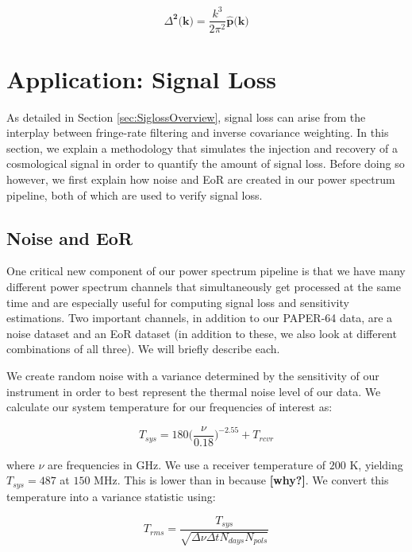 \documentclass[preprint2,numberedappendix,tighten,twocolappendix]{aastex6}  %
\newcommand{\cc}[1]{{\color{purple} \textbf{[#1]}}}
\begin{document}
\begin{equation}
\Delta^{\textbf{2}}\textbf{(k)} = \frac{k^{3}}{2\pi^{2}}\hat{\textbf{p}}\textbf{(k)}
\end{equation}

\section{Application: Signal Loss}
\label{sec:Sigloss}

As detailed in Section \ref{sec:SiglossOverview}, signal loss can arise from the interplay between fringe-rate filtering and inverse covariance weighting. In this section, we explain a methodology that simulates the injection and recovery of a cosmological signal in order to quantify the amount of signal loss. Before doing so however, we first explain how noise and EoR are created in our power spectrum pipeline, both of which are used to verify signal loss.

\subsection{Noise and EoR}

One critical new component of our power spectrum pipeline is that we have many different power spectrum channels that simultaneously get processed at the same time and are especially useful for computing signal loss and sensitivity estimations. Two important channels, in addition to our PAPER-64 data, are a noise dataset and an EoR dataset (in addition to these, we also look at different combinations of all three). We will briefly describe each.

We create random noise with a variance determined by the sensitivity of our instrument in order to best represent the thermal noise level of our data. We calculate our system temperature for our frequencies of interest as:

\begin{equation}
\label{eq:sys}
T_{sys} = 180\Big(\frac{\nu}{0.18}\Big)^{-2.55} + T_{rcvr}
\end{equation}

where $\nu$ are frequencies in GHz. We use a receiver temperature of $200$ K, yielding $T_{sys} = 487$ at $150$ MHz. This is lower than in \citet{ali_et_al2015} because \cc{why?}. We convert this temperature into a variance statistic using:

\begin{equation}
T_{rms} = \frac{T_{sys}}{\sqrt{\Delta\nu \Delta t N_{days} N_{pols}}}
\end{equation}
\end{document}
